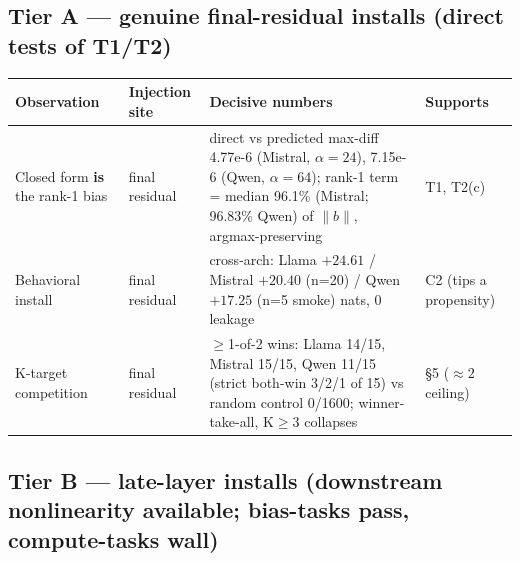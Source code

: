\documentclass[11pt]{article}
\theoremstyle{plain}
\theoremstyle{definition}
\begin{document}
\subsection*{Tier A --- genuine final-residual installs (direct tests of T1/T2)}

\begin{table}[ht]
\centering
\footnotesize
\begin{tabular}{p{3.0cm}p{2.2cm}p{5.6cm}p{1.6cm}}
\toprule
Observation & Injection site & Decisive numbers & Supports \\
\midrule
Closed form \textbf{is} the rank-1 bias & final residual & direct vs predicted max-diff 4.77e-6 (Mistral, $\alpha=24$), 7.15e-6 (Qwen, $\alpha=64$); rank-1 term = median 96.1\% (Mistral; 96.83\% Qwen) of $\lVert b \rVert$, argmax-preserving & T1, T2(c) \\
Behavioral install & final residual & cross-arch: Llama $+24.61$ / Mistral $+20.40$ (n=20) / Qwen $+17.25$ (n=5 smoke) nats, 0 leakage & C2 (tips a propensity) \\
K-target competition & final residual & $\ge$1-of-2 wins: Llama 14/15, Mistral 15/15, Qwen 11/15 (strict both-win 3/2/1 of 15) vs random control 0/1600; winner-take-all, K$\ge$3 collapses & \S5 ($\approx 2$ ceiling) \\
\bottomrule
\end{tabular}
\end{table}

\subsection*{Tier B --- late-layer installs (downstream nonlinearity available; bias-tasks pass, compute-tasks wall)}
\end{document}
